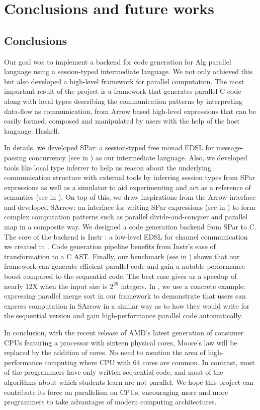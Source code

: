 \chapter{Conclusions and future works}
\section{Conclusions}

Our goal was to implement a backend for code generation for Alg parallel language using a session-typed intermediate language. We not only achieved this but also developed a high-level framework for parallel computation. The most important result of the project is a framework that generates parallel C code along with local types describing the communication patterns by interpreting data-flow as communication, from Arrow based high-level expressions that can be easily formed, composed and manipulated by users with the help of the host language: Haskell.

In details, we developed SPar: a session-typed free monad EDSL for message-passing concurrency (see in ) as our intermediate language. Also, we developed tools like local type inferrer to help us reason about the underlying communication structure with external tools by inferring session types from SPar expressions as well as a simulator to aid experimenting and act as a reference of semantics (see in ). On top of this, we draw inspirations from the Arrow interface and developed SArrow: an interface for writing SPar expressions (see in ) to form complex computation patterns such as parallel divide-and-conquer and parallel map in a composite way. We designed a code generation backend from SPar to C. The core of the backend is Instr : a low-level EDSL for channel communication we created in . Code generation pipeline benefits from Instr's ease of transformation to a C AST. Finally, our benchmark (see in ) shows that our framework can generate efficient parallel code and gain a notable performance boost compared to the sequential code. The best case gives us a speedup of nearly 12X when the input size is $2^{26}$ integers. In , we use a concrete example: expressing parallel merge sort in our framework to demonstrate that users can express computation in SArrow in a similar way as to how they would write for the sequential version and gain high-performance parallel code automatically.

In conclusion, with the recent release of AMD's latest generation of consumer CPUs featuring a processor with sixteen physical cores, Moore's law will be replaced by the addition of cores. No need to mention the area of high-performance computing where CPU with 64 cores are common. In contrast, most of the programmers have only written sequential code, and most of the algorithms about which students learn are not parallel. We hope this project can contribute its force on parallelism on CPUs, encouraging more and more programmers to take advantages of modern computing architectures.

